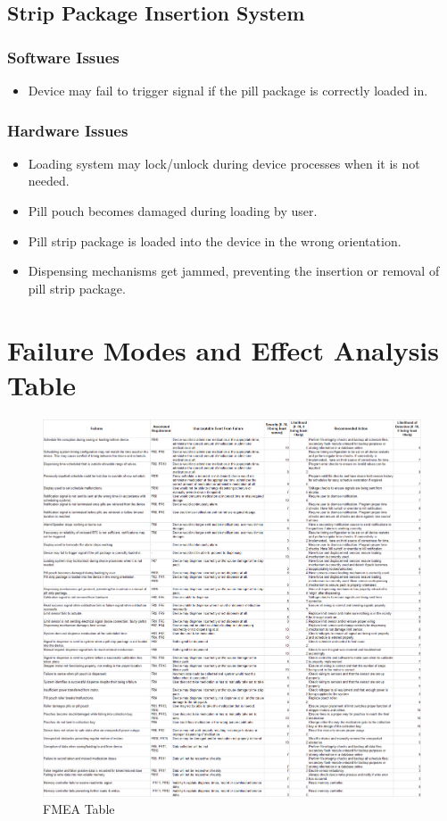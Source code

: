 \documentclass[12pt]{article}
\begin{document}
\subsection{Strip Package Insertion System}
\subsubsection*{Software Issues}
\begin{itemize}
\item Device may fail to trigger signal if the pill package is correctly loaded in.
\end{itemize}
\subsubsection*{Hardware Issues}
\begin{itemize}
\item Loading system may lock/unlock during device processes when it is not needed.
\item Pill pouch becomes damaged during loading by user.
\item Pill strip package is loaded into the device in the wrong orientation.
\item Dispensing mechanisms get jammed, preventing the insertion or removal of pill strip package.
\end{itemize}

\pagebreak
\section{Failure Modes and Effect Analysis Table}


\begin{figure}[!htbp]
    \includegraphics[width=\textwidth,height=\textheight,keepaspectratio]{./FMEA.png}
    \caption{FMEA Table}
    \label{fig:my_label}
\end{figure}
\end{document}
